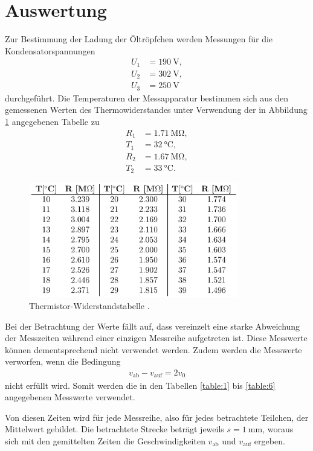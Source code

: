 \section{Auswertung}
\label{sec:Auswertung}

Zur Bestimmung der Ladung der Öltröpfchen werden Messungen für die Kondensatorspannungen
\begin{align*}
U_1 &= \SI{190}{\volt},\\
U_2 &= \SI{302}{\volt},\\
U_3 &= \SI{250}{\volt}
\end{align*}
durchgeführt.
Die Temperaturen der Messapparatur bestimmen sich aus den gemessenen Werten des Thermowiderstandes unter Verwendung der in Abbildung \ref{tab:thermo} angegebenen Tabelle zu
\begin{align*}
R_1 &= \SI{1.71}{\mega\ohm},\\
T_1 &= \SI{32}{\celsius},\\
R_2 &= \SI{1.67}{\mega\ohm},\\
T_2 &= \SI{33}{\celsius}.
\end{align*}
\begin{figure}
  \centering
  \includegraphics[height=5cm]{ressources/thermo.png}
  \caption{Thermistor-Widerstandstabelle \cite{skript}.}
  \label{tab:thermo}
\end{figure}
Bei der Betrachtung der Werte fällt auf, dass vereinzelt eine starke Abweichung der Messzeiten während einer einzigen Messreihe aufgetreten ist.
Diese Messwerte können dementsprechend nicht verwendet werden.
Zudem werden die Messwerte verworfen, wenn die Bedingung
\begin{align*}
  v_{\text{ab}} - v_{\text{auf}} = 2 v_0
\end{align*}
nicht erfüllt wird.
Somit werden die in den Tabellen \ref{table:1} bis \ref{table:6} angegebenen Messwerte verwendet.






Von diesen Zeiten wird für jede Messreihe, also für jedes betrachtete Teilchen, der Mittelwert gebildet.
Die betrachtete Strecke beträgt jeweils $s = \SI{1}{\milli\metre}$, woraus sich mit den gemittelten Zeiten die Geschwindigkeiten $v_{\text{ab}}$ und $v_{\text{auf}}$ ergeben.


